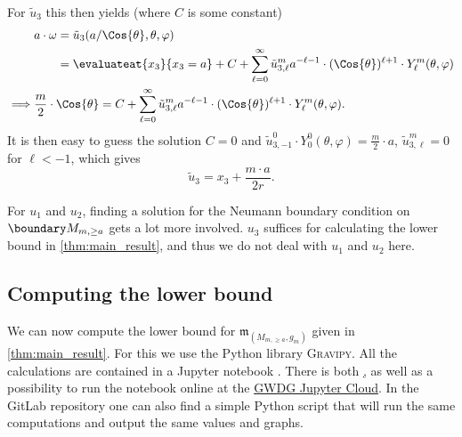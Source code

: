 \documentclass[titlepage,numbers=noenddot,headinclude,oneside,%
footinclude=true,cleardoublepage=empty,%
BCOR=5mm,paper=a4,fontsize=11pt,%
english,%
]{scrartcl}
\newcommand{\mass}[2]{\mathfrak{m}_{(#1,#2)}} %
\begin{document}
\begin{description}
    For \( \tilde{u}_3 \) this then yields (where \( C \) is some constant)
    \begin{align*}
        &\begin{aligned}[t]
            a\cdot \omega&=\tilde{u}_3(a/\Cos{\theta},\theta,\varphi)\\
            &=\evaluateat{x_3}{x_3=a}+C+\sum_{\ell=0}^{\infty}\tilde{u}_{3,\ell}^m a^{-\ell-1}\cdot (\Cos{\theta})^{\ell+1}\cdot Y^m_{\ell}(\theta,\varphi)
        \end{aligned}\\
        \implies &\frac{m}{2}\cdot \Cos{\theta}=C+\sum_{\ell=0}^{\infty}\tilde{u}_{3,\ell}^m a^{-\ell-1}\cdot (\Cos{\theta})^{\ell+1}\cdot Y^m_{\ell}(\theta,\varphi).
    \end{align*}
    It is then easy to guess the solution \( C=0 \) and \( \tilde{u}_{3,-1}^0\cdot Y_0^0(\theta,\varphi)=\frac{m}{2}\cdot a \), \( \tilde{u}_{3,\ell}^m=0 \) for \( \ell< -1 \), which gives
    \begin{equation*}
        \tilde{u}_3=x_3+\frac{m\cdot a}{2 r}.
    \end{equation*}

    For \( u_1 \) and \( u_2 \), finding a solution for the Neumann boundary condition on \( \modifiedschwarzschildboundary \) gets a lot more involved. \( u_3 \) suffices for calculating the lower bound in \cref{thm:main_result}, and thus we do not deal with \( u_1 \) and \( u_2 \) here.
\end{description}
\subsection{Computing the lower bound}
We can now compute the lower bound for \( \mass{M_{m,\geq a}}{g_m} \) given in \cref{thm:main_result}. For this we use the Python library \textsc{Gravipy}. All the calculations are contained in a Jupyter notebook \cite{fischerhenryrubenHarmonicFunctionMethod2023}. There is both \href{https://gitlab.gwdg.de/henryruben.fischer/bachelor-thesis-harmonic-functions-and-mass-of-asymptotically-flat-half-spaces/-/blob/master/computations_and_graphs/computations_and_graphs.ipynb{a repository on the GWDG GitLab}}, as well as a possibility to run the notebook online at the \href{https://jupyter-cloud.gwdg.de/jhub/hub/user-redirect/lab/tree/bachelors-thesis-harmonic-functions-mass-asymptotically-flat-half-spaces/computations_and_graphs.ipynb}{GWDG Jupyter Cloud}. In the GitLab repository one can also find a simple Python script that will run the same computations and output the same values and graphs.
\end{document}
